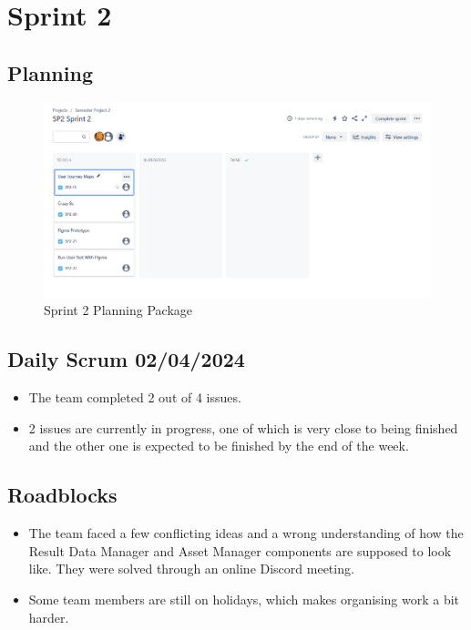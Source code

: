 \documentclass[12pt]{report}
\begin{document}
\section{Sprint 2}
\subsection*{Planning}
\begin{figure}[H]
  \centering
  \includegraphics[width=1\textwidth]{Resources/2-Sprint/Planning/Sprint2_Planning_Package.png}
  \caption{Sprint 2 Planning Package}
  \label{fig:S2Planning}
\end{figure}

\subsection*{Daily Scrum 02/04/2024}

\begin{itemize}
    \item The team completed 2 out of 4 issues.
    \item 2 issues are currently in progress, one of which is very close to being finished and the other one is expected to be finished by the end of the week.
\end{itemize}

\subsection*{Roadblocks}
\begin{itemize}
    \item The team faced a few conflicting ideas and a wrong understanding of how the Result Data Manager and Asset Manager components are supposed to look like. They were solved through an online Discord meeting.
    \item Some team members are still on holidays, which makes organising work a bit harder.
\end{itemize}
\end{document}
